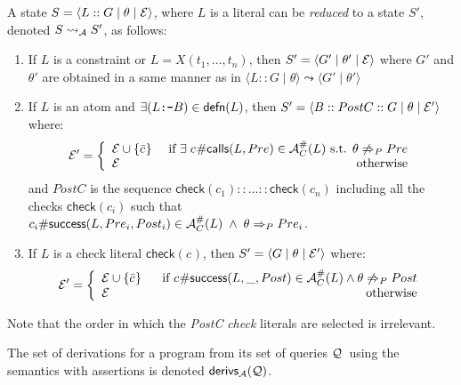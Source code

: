 \documentclass{llncs}
\newcommand{\Q}{\ensuremath{{\cal Q}}}
\newcommand{\A}
  {\ensuremath{{\cal A}}}
\newcommand{\AC}
  {\ensuremath{{\cal A}_{C}}}
\newcommand{\LabAClit}[1]
  {\ensuremath{\AC^{\#}(#1)}}
\newcommand{\gd}[0]{\mid}
\newcommand{\state}[2]
  {\ensuremath{\langle #1 \gd{} #2 \rangle}}
\newcommand{\exstate}[3]
  {\ensuremath{\langle #1 \gd{} #2 \gd{} #3 \rangle}}
\newcommand{\ADeps}{\ensuremath{{\cal E}}}
\newcommand{\defn}[1]
  {\ensuremath{\textsf{defn}(#1)}}
\newcommand{\reduction}[2]
  {\ensuremath{#1 \leadsto #2}}
\newcommand{\reductionA}[2]
  {\ensuremath{#1 \leadsto_{\A} #2}}
\newcommand{\derivationsA}[1]
  {\ensuremath{\textsf{derivs}_{\A}(#1)}}
\newcommand{\asrId}[1]{\ensuremath{c_{#1}}}
\newcommand{\negAsrId}[1]{\ensuremath{\bar{c}_{#1}}}
\newcommand{\checkLitLab}[1]{\ensuremath{\textsf{check}(#1)}}
\newcommand{\labCallsAsr}[3]
  {\ensuremath{\textsf{\asrId{#1}\#calls}(#2, #3)}}
\newcommand{\labSuccessAsr}[4]
  {\ensuremath{\textsf{\asrId{#1}\#success}(#2, #3, #4)}}
\begin{document}
\begin{definition} 
  \label{def:ho-fo-reductions}
  A state $S = \exstate{L::G}{\theta}{\ADeps}$, where $L$ is a literal
  can be \emph{reduced} to a state $S'$, denoted \reductionA{S}{S'},
  as follows:
  \begin{enumerate}\setlength{\itemsep}{0mm}\setlength{\parskip}{0mm}
  \item 
    If $L$ is a constraint or $L = X(t_1,\ldots,t_n)$, then
    $S' = \exstate{G'}{\theta'}{\ADeps}$ where $G'$ and $\theta'$
    are obtained in a same manner as in
    \reduction{\state{L::G}{\theta}}{\state{G'}{\theta'}}
  \item 
    If $L$ is an atom and $\exists (L \mbox{\tt :-} B) \in \defn{L}$,
    then $S' = \exstate{B :: PostC :: G}{\theta}{\ADeps'}$ where:
    \[
      \ADeps' = \left\{
      \begin{array}{lr}
        \ADeps \cup \{\negAsrId{}\}
      & ~\text{if } \exists \; 
        \labCallsAsr{}{L}{Pre} \in \LabAClit{L} \text{ s.t. }
        \theta \not\Rightarrow_P Pre
      \\
        \ADeps 
      & \text{otherwise}
      \end{array}
      \right.
    \]
    and $PostC$ is the sequence 
    $\checkLitLab{\asrId{1}} :: \ldots :: \checkLitLab{\asrId{n}}$
    including all the checks $\checkLitLab{\asrId{i}}$ such that
    $\labSuccessAsr{i}{L}{Pre_i}{Post_i} \in \LabAClit{L} \;\land\; 
      \theta \Rightarrow_P Pre_i$.
  \item 
    If $L$ is a check literal $\checkLitLab{\asrId{}}$, then
    $S' = \exstate{G}{\theta}{\ADeps'}$ where:
    \[
      \ADeps' = \left\{
      \begin{array}{lr}
        \ADeps \cup \{\negAsrId{}\}
        & ~~\textrm{if}~ \labSuccessAsr{}{L}{\_}{Post} \in \LabAClit{L}
          \wedge \theta \not\Rightarrow_P Post 
        \\
        \ADeps 
        & \textrm{otherwise}
      \end{array}
      \right.
    \]
  \end{enumerate}
Note that the order in which the \emph{PostC} \emph{check} literals
  are selected is irrelevant.
\end{definition}

The set of derivations for a program from its set of queries \Q\
using the semantics with assertions is denoted $\derivationsA{\Q}$.
\end{document}
